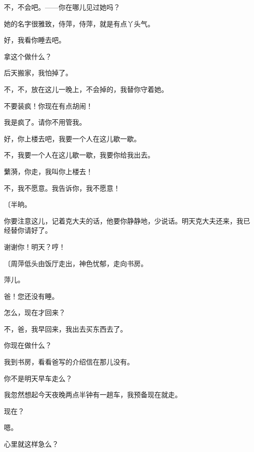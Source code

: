 不，不会吧。——你在哪儿见过她吗？

她的名字很雅致，侍萍，侍萍，就是有点丫头气。

好，我看你睡去吧。

拿这个做什么？

后天搬家，我怕掉了。

不，不，放在这儿一晚上，不会掉的，我替你守着她。

不要装疯！你现在有点胡闹！

我是疯了。请你不用管我。

好，你上楼去吧，我要一个人在这儿歇一歇。

不，我要一个人在这儿歇一歇，我要你给我出去。

蘩漪，你走，我叫你上楼去！

不，我不愿意。我告诉你，我不愿意！

{\fangsong〔半晌。}

你要注意这儿，记着克大夫的话，他要你静静地，少说话。明天克大夫还来，我已经替你请好了。

谢谢你！明天？哼！

{\fangsong〔周萍低头由饭厅走出，神色忧郁，走向书房。}

萍儿。

爸！您还没有睡。

怎么，现在才回来？

不，爸，我早回来，我出去买东西去了。

你现在做什么？

我到书房，看看爸写的介绍信在那儿没有。

你不是明天早车走么？

我忽然想起今天夜晚两点半钟有一趟车，我预备现在就走。

现在？

嗯。

心里就这样急么？

